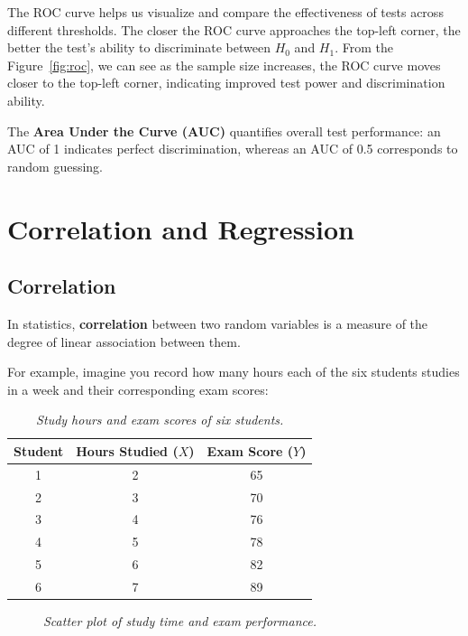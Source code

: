 \documentclass[twoside]{book}
\begin{document}
The ROC curve helps us visualize and compare the effectiveness of tests across different thresholds. The closer the ROC curve approaches the top-left corner, the better the test's ability to discriminate between \(H_0\) and \(H_1\). From the Figure~\ref{fig:roc}, we can see as the sample size increases, the ROC curve moves closer to the top-left corner, indicating improved test power and discrimination ability.

The \textbf{Area Under the Curve (AUC)} quantifies overall test performance: an AUC of 1 indicates perfect discrimination, whereas an AUC of 0.5 corresponds to random guessing.

\chapter{Correlation and Regression}

\section{Correlation}

\begin{textbox}
In statistics, \textbf{correlation} between two random variables is a measure of the degree of linear association between them.
\end{textbox}
 For example, imagine you record how many hours each of the six students studies in a week and their corresponding exam scores:

\begin{table}[h!]
	\centering
	\begin{tabular}{c|c|c}
		\toprule
		\textbf{Student} & \textbf{Hours Studied} ($X$) & \textbf{Exam Score} ($Y$) \\
		\midrule
		1 & 2 & 65 \\
		2 & 3 & 70 \\
		3 & 4 & 76 \\
		4 & 5 & 78 \\
		5 & 6 & 82 \\
		6 & 7 & 89 \\
		\bottomrule
	\end{tabular}
	\caption{\textit{Study hours and exam scores of six students.}}
	\label{tab:study_scores}
\end{table}

\begin{figure}[h!]
	\centering
	\caption{\textit{Scatter plot of study time and exam performance.}}
\end{figure}
\end{document}
